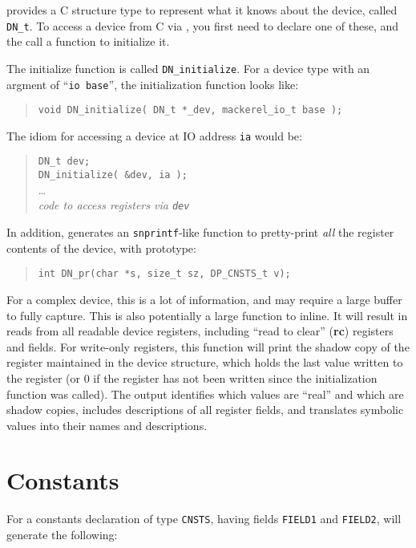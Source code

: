 \documentclass[a4paper,11pt,twoside]{report}
\begin{document}
\Mac provides a C structure type to represent what it knows about the
device, called \texttt{DN\_t}.  To access a device from C via \Mac,
you first need to declare one of these, and the call a function to
initialize it. 

The initialize function is called \texttt{DN\_initialize}.  For a
device type with an argment of ``\texttt{io base}'', the
initialization function looks like:

\begin{quote}
\texttt{void DN\_initialize( DN\_t *\_dev, mackerel\_io\_t base );}
\end{quote}

The idiom for accessing a device at IO address \texttt{ia} would be:

\begin{quote}
  \texttt{DN\_t dev;}\\
  \texttt{DN\_initialize( \&dev, ia );}\\
  \ldots\\
  \textit{code to access registers via \texttt{dev}}
\end{quote}

In addition, \Mac generates an \texttt{snprintf}-like function to
pretty-print \emph{all} the register contents of the device, with prototype:
\begin{quote}
  \texttt{int DN\_pr(char *s, size\_t sz, DP\_CNSTS\_t v);}
\end{quote}
For a complex device, this is a lot of information, and may require a
large buffer to fully capture.  This is also potentially a large
function to inline.  It will result in reads from all readable device
registers, including ``read to clear'' (\textbf{rc}) registers and
fields.  For write-only registers, this function will print the shadow
copy of the register maintained in the device structure, which holds
the last value written to the register (or 0 if the register has not
been written since the initialization function was called).  The
output identifies which values are ``real'' and which are shadow
copies, includes descriptions of all register fields, and translates
symbolic values into their names and descriptions. 

\section{Constants}

For a constants declaration of type \texttt{CNSTS}, having fields
\texttt{FIELD1} and \texttt{FIELD2}, \Mac will generate the following:
\end{document}
